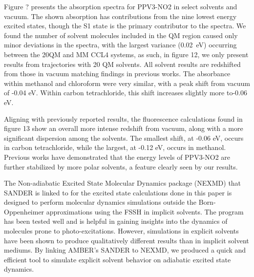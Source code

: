     Figure ? presents the absorption spectra for PPV3-NO2 in select solvents and vacuum.
    The shown absorption has contributions from the nine lowest energy excited states, though the S1 state is the primary contributor to the spectra.
    We found the number of solvent molecules included in the QM region caused only minor deviations in the spectra, with the largest variance (0.02~eV) occurring between the 20QM and MM CCL4 systems, as such, in figure 12, we only present results from trajectories with 20 QM solvents.
    All solvent results are redshifted from those in vacuum matching findings in previous works.
    The absorbance within methanol and chloroform were very similar, with a peak shift from vacuum of -0.04 eV.
    Within carbon tetrachloride, this shift increases slightly more to-0.06 eV. 

    Aligning with previously reported results, the fluorescence calculations found in figure 13 show an overall more intense redshift from vacuum, along with a more significant dispersion among the solvents. \cite{Park2013}
    The smallest shift, at -0.06 eV, occurs in carbon tetrachloride, while the largest, at -0.12 eV, occurs in methanol.
    Previous works have demonstrated that the energy levels of PPV3-NO2 are further stabilized by more polar solvents, a feature clearly seen by our results.

The Non-adiabatic Excited State Molecular Dynamics package (NEXMD) that SANDER is linked to for the excited state calculations done in this paper is designed to perform molecular dynamics simulations outside the Born-Oppenheimer approximations using the FSSH in implicit solvents.
The program has been tested well and is helpful in gaining insights into the dynamics of molecules prone to photo-excitations.
However, simulations in explicit solvents have been shown to produce qualitatively different results than in implicit solvent mediums.
By linking AMBER's SANDER to NEXMD, we produced a quick and efficient tool to simulate explicit solvent behavior on adiabatic excited state dynamics.
